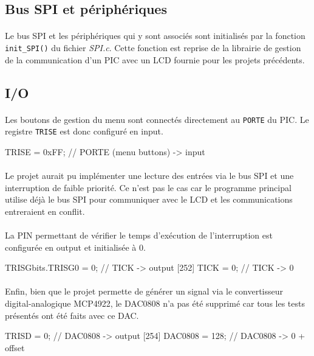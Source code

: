 \documentclass{article}
\begin{document}
    \subsection{Bus SPI et périphériques}
    \paragraph{}
    Le bus SPI et les périphériques qui y sont associés sont initialisés par la fonction \texttt{init\_SPI()} du fichier \emph{SPI.c}. Cette fonction est reprise de la librairie de gestion de la communication d'un PIC avec un LCD fournie pour les projets précédents.

    \subsection{I/O}
    \paragraph{}
    Les boutons de gestion du menu sont connectés directement au \texttt{PORTE} du PIC. Le registre \texttt{TRISE} est donc configuré en input.
    \begin{verbatimtab}
    [250]    TRISE   = 0xFF;         // PORTE (menu buttons) -> input
    \end{verbatimtab}

    \paragraph{}
    Le projet aurait pu implémenter une lecture des entrées via le bus SPI et une interruption de faible priorité. Ce n'est pas le cas car le programme principal utilise déjà le bus SPI pour communiquer avec le LCD et les communications entreraient en conflit.

    \paragraph{}
    La PIN permettant de vérifier le temps d'exécution de l'interruption est configurée en output et initialisée à 0.
    \begin{verbatimtab}
    [251]    TRISGbits.TRISG0 = 0;   // TICK -> output
    [252]    TICK    = 0;            // TICK -> 0
    \end{verbatimtab}

    \paragraph{}
    Enfin, bien que le projet permette de générer un signal via le convertisseur digital-analogique MCP4922, le DAC0808 n'a pas été supprimé car tous les tests présentés ont été faits avec ce DAC.
    \begin{verbatimtab}
    [253]    TRISD   = 0;            // DAC0808 -> output
    [254]    DAC0808 = 128;          // DAC0808 -> 0 + offset
    \end{verbatimtab}
\end{document}
